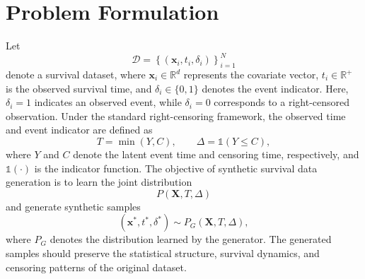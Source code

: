 \documentclass[twoside]{article}
\begin{document}
\section{Problem Formulation}
Let
\[
\mathcal{D}
=
\left\{
(\mathbf{x}_i,t_i,\delta_i)
\right\}_{i=1}^{N}
\]
denote a survival dataset, where \(\mathbf{x}_i\in\mathbb{R}^{d}\) represents the covariate vector, \(t_i\in\mathbb{R}^{+}\) is the observed survival time, and \(\delta_i\in\{0,1\}\) denotes the event indicator. Here, \(\delta_i=1\) indicates an observed event, while \(\delta_i=0\) corresponds to a right-censored observation.
Under the standard right-censoring framework, the observed time and event indicator are defined as
\[
T=\min(Y,C),
\qquad
\Delta=\mathbb{1}(Y\leq C),
\]
where \(Y\) and \(C\) denote the latent event time and censoring time, respectively, and \(\mathbb{1}(\cdot)\) is the indicator function.
The objective of synthetic survival data generation is to learn the joint distribution
\[
P(\mathbf{X},T,\Delta)
\]
and generate synthetic samples
\[
(\mathbf{x}^{*},t^{*},\delta^{*})
\sim
P_G(\mathbf{X},T,\Delta),
\]
where \(P_G\) denotes the distribution learned by the generator. The generated samples should preserve the statistical structure, survival dynamics, and censoring patterns of the original dataset.
\end{document}
